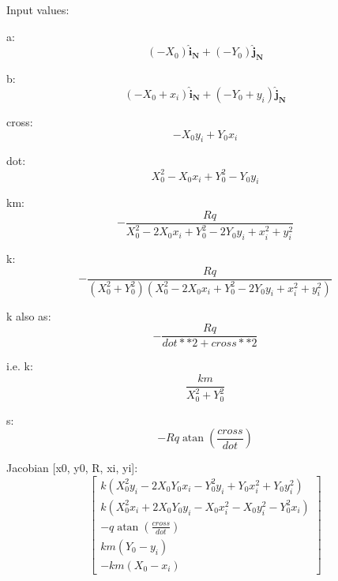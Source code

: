\documentclass[8pt]{article}
\begin{document}
Input values:

a:
\begin{equation}(- X_{0})\mathbf{\hat{i}_{N}} + (- Y_{0})\mathbf{\hat{j}_{N}}\end{equation}

b:
\begin{equation}(- X_{0} + x_{i})\mathbf{\hat{i}_{N}} + (- Y_{0} + y_{i})\mathbf{\hat{j}_{N}}\end{equation}

cross:
\begin{equation}- X_{0} y_{i} + Y_{0} x_{i}\end{equation}

dot:
\begin{equation}X_{0}^{2} - X_{0} x_{i} + Y_{0}^{2} - Y_{0} y_{i}\end{equation}

km:
\begin{equation}- \frac{R q}{X_{0}^{2} - 2 X_{0} x_{i} + Y_{0}^{2} - 2 Y_{0} y_{i} + x_{i}^{2} + y_{i}^{2}}\end{equation}

k:
\begin{equation}- \frac{R q}{\left(X_{0}^{2} + Y_{0}^{2}\right) \left(X_{0}^{2} - 2 X_{0} x_{i} + Y_{0}^{2} - 2 Y_{0} y_{i} + x_{i}^{2} + y_{i}^{2}\right)}\end{equation}

k also as:
\begin{equation}- \frac{R q}{dot**2+cross**2}\end{equation}

i.e. k:
\begin{equation}\frac{km}{X_{0}^{2} + Y_{0}^{2}}\end{equation}

s:
\begin{equation}- R q \operatorname{atan}{\left (\frac{cross}{dot} \right )}\end{equation}

Jacobian [x0, y0, R, xi, yi]:
\begin{equation}\left[\begin{smallmatrix}k \left(X_{0}^{2} y_{i} - 2 X_{0} Y_{0} x_{i} - Y_{0}^{2} y_{i} + Y_{0} x_{i}^{2} + Y_{0} y_{i}^{2}\right)\\k \left(X_{0}^{2} x_{i} + 2 X_{0} Y_{0} y_{i} - X_{0} x_{i}^{2} - X_{0} y_{i}^{2} - Y_{0}^{2} x_{i}\right)\\- q \operatorname{atan}{\left (\frac{cross}{dot} \right )}\\km \left(Y_{0} - y_{i}\right)\\-km \left(X_{0} - x_{i}\right)\end{smallmatrix}\right]\end{equation}
\end{document}
